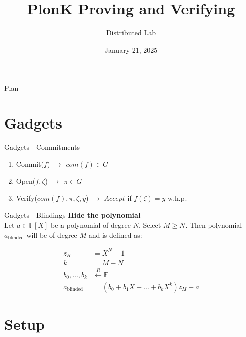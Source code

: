 \documentclass{zkdl-presentation-template}
\title[PlonK Proving and Verifying]{\textbf{PlonK Proving and Verifying}}
\author{Distributed Lab}
\date{January 21, 2025}
\begin{document}

    \begin{frame}{Plan}
        \tableofcontents
    \end{frame}

    \section{Gadgets}

    \begin{frame}{Gadgets - Commitments}
        \begin{enumerate}
            \item Commit($f$) $\rightarrow$ $com(f) \in G$
            \item Open($f, \zeta$) $\rightarrow$ $\pi \in G$
            \item Verify($com(f), \pi, \zeta, y$) $\rightarrow$ $Accept$ if $f(\zeta) = y$ w.h.p.
        \end{enumerate}
    \end{frame}

    \begin{frame}{Gadgets - Blindings}
        \textbf{Hide the polynomial} \\
        Let $a \in \mathbb{F}[X]$ be a polynomial of degree $N$. Select $M \geq N$.
        Then polynomial $a_{\text{blinded}}$ will be of degree $M$ and is defined as:

        \begin{align*}
            z_H &= X^N - 1 \\
            k &= M - N \\
            b_0, \dots, b_k &\xleftarrow{R} \mathbb{F} \\
            a_{\text{blinded}} &= (b_0 + b_1 X + \dots + b_k X^k) z_H + a
        \end{align*}
    \end{frame}

    \section{Setup}
\end{document}
